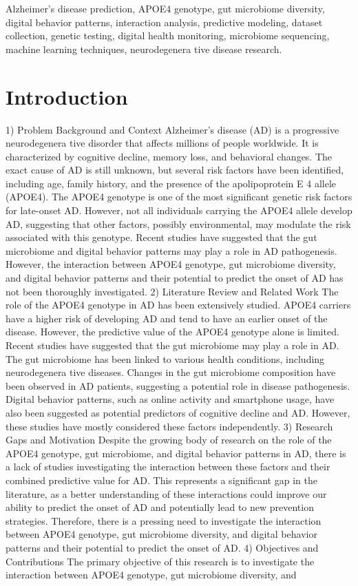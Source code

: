 \documentclass[conference]{IEEEtran}
\begin{document}
\begin{IEEEkeywords}
Alzheimer's disease prediction, APOE4 genotype, gut microbiome diversity, digital behavior patterns, interaction analysis, predictive modeling, dataset collection, genetic testing, digital health monitoring, microbiome sequencing, machine learning techniques, neurodegenera tive disease research.
\end{IEEEkeywords}

\section{Introduction}
1) Problem Background and Context Alzheimer's disease (AD) is a progressive neurodegenera tive disorder that affects millions of people worldwide. It is characterized by cognitive decline, memory loss, and behavioral changes. The exact cause of AD is still unknown, but several risk factors have been identified, including age, family history, and the presence of the apolipoprotein E 4 allele (APOE4). The APOE4 genotype is one of the most significant genetic risk factors for late-onset AD. However, not all individuals carrying the APOE4 allele develop AD, suggesting that other factors, possibly environmental, may modulate the risk associated with this genotype. Recent studies have suggested that the gut microbiome and digital behavior patterns may play a role in AD pathogenesis. However, the interaction between APOE4 genotype, gut microbiome diversity, and digital behavior patterns and their potential to predict the onset of AD has not been thoroughly investigated. 2) Literature Review and Related Work The role of the APOE4 genotype in AD has been extensively studied. APOE4 carriers have a higher risk of developing AD and tend to have an earlier onset of the disease. However, the predictive value of the APOE4 genotype alone is limited. Recent studies have suggested that the gut microbiome may play a role in AD. The gut microbiome has been linked to various health conditions, including neurodegenera tive diseases. Changes in the gut microbiome composition have been observed in AD patients, suggesting a potential role in disease pathogenesis. Digital behavior patterns, such as online activity and smartphone usage, have also been suggested as potential predictors of cognitive decline and AD. However, these studies have mostly considered these factors independently. 3) Research Gaps and Motivation Despite the growing body of research on the role of the APOE4 genotype, gut microbiome, and digital behavior patterns in AD, there is a lack of studies investigating the interaction between these factors and their combined predictive value for AD. This represents a significant gap in the literature, as a better understanding of these interactions could improve our ability to predict the onset of AD and potentially lead to new prevention strategies. Therefore, there is a pressing need to investigate the interaction between APOE4 genotype, gut microbiome diversity, and digital behavior patterns and their potential to predict the onset of AD. 4) Objectives and Contributions The primary objective of this research is to investigate the interaction between APOE4 genotype, gut microbiome diversity, and 
\end{document}
